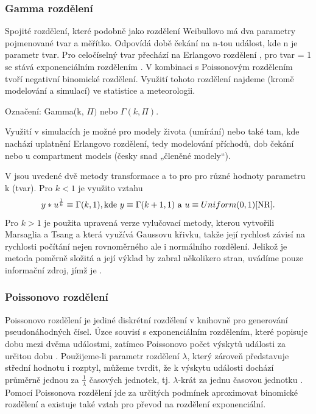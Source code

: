 \documentclass[a4paper,11pt]{article}
\begin{document}
\subsubsection{Gamma rozdělení}

Spojité rozdělení, které podobně jako rozdělení Weibullovo má dva parametry pojmenované tvar a měřítko. Odpovídá době čekání na n-tou událost, kde n je parametr tvar. Pro celočíselný tvar přechází na Erlangovo rozdělení \cite{Wiki2}, pro tvar = 1 se stává exponenciálním rozdělením \cite{Wgamma}. V kombinaci s Poissonovým rozdělením tvoří negativní binomické rozdělení. Využití tohoto rozdělení najdeme (kromě modelování a simulací) ve statistice a meteorologii. \cite{Wiki2}

Označení: Gamma(k, $\Pi)$ nebo $\Gamma(k,  \Pi)$.

Využití v simulacích je možné pro modely života (umírání) \cite{Wgamma} \cite{Wiki2} nebo také tam, kde nachází uplatnění Erlangovo rozdělení, tedy modelování příchodů, dob čekání nebo u compartment models (česky snad „členěné modely“).

V \cite{NR} jsou uvedené dvě metody transformace a to pro pro různé hodnoty parametru k (tvar). Pro $k < 1$ je využito vztahu $$y*u^{\frac{1}{k}} \equiv \Gamma(k, 1), \text{kde } y \equiv \Gamma(k+1, 1) \text{ a } u \equiv Uniform(0, 1) \text{\cite{NR}}.$$ Pro $k > 1$ je použita upravená verze vylučovací metody, kterou vytvořili Marsaglia a Tsang a která využívá Gaussovu křivku, takže její rychlost závisí na rychlosti počítání nejen rovnoměrného ale i normálního rozdělení. Jelikož je metoda poměrně složitá a její výklad by zabral několikero stran, uvádíme pouze informační zdroj, jímž je \cite{Marsaglia}. 

\subsubsection{Poissonovo rozdělení}

Poissonovo rozdělení je jediné diskrétní rozdělení v knihovně pro generování pseudonáhodných čísel. Úzce souvisí s exponenciálním rozdělením, které popisuje dobu mezi dvěma událostmi, zatímco Poissonovo počet výskytů události za určitou dobu \cite{INM}. Použijeme-li parametr rozdělení $\lambda$, který zároveň představuje střední hodnotu i rozptyl, můžeme tvrdit, že k výskytu události dochází průměrně jednou za $\frac{1}{\lambda}$ časových jednotek, tj. $\lambda$-krát za jednu časovou jednotku \cite{INM}. Pomocí Poissonova rozdělení jde za určitých podmínek aproximovat binomické rozdělení \cite{INM} a existuje také vztah pro převod na rozdělení exponenciální.
\end{document}
